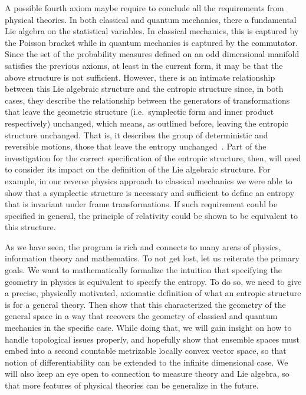 A possible fourth axiom maybe require to conclude all the requirements from physical theories. In both classical and quantum mechanics, there a fundamental Lie algebra on the statistical variables. In classical mechanics, this is captured by the Poisson bracket while in quantum mechanics is captured by the commutator. Since the set of the probability measures defined on an odd dimensional manifold satisfies the previous axioms, at least in the current form, it may be that the above structure is not sufficient. However, there is an intimate relationship between this Lie algebraic structure and the entropic structure since, in both cases, they describe the relationship between the generators of transformations that leave the geometric structure (i.e.~symplectic form and inner product respectively) unchanged, which means, as outlined before, leaving the entropic structure unchanged. That is, it describes the group of deterministic and reversible motions, those that leave the entropy unchanged~\cite{aop-HamConsInfoEnt,aop-HamQuantInfo,aop-book}. Part of the investigation for the correct specification of the entropic structure, then, will need to consider its impact on the definition of the Lie algebraic structure. For example, in our reverse physics approach to classical mechanics we were able to show that a symplectic structure is necessary and sufficient to define an entropy that is invariant under frame transformations. If such requirement could be specified in general, the principle of relativity could be shown to be equivalent to this structure.

As we have seen, the program is rich and connects to many areas of physics, information theory and mathematics. To not get lost, let us reiterate the primary goals. We want to mathematically formalize the intuition that specifying the geometry in physics is equivalent to specify the entropy. To do so, we need to give a precise, physically motivated, axiomatic definition of what an entropic structure is for a general theory. Then show that this characterized the geometry of the general space in a way that recovers the geometry of classical and quantum mechanics in the specific case. While doing that, we will gain insight on how to handle topological issues properly, and hopefully show that ensemble spaces must embed into a second countable metrizable locally convex vector space, so that notion of differentiability can be extended to the infinite dimensional case. We will also keep an eye open to connection to measure theory and Lie algebra, so that more features of physical theories can be generalize in the future.


